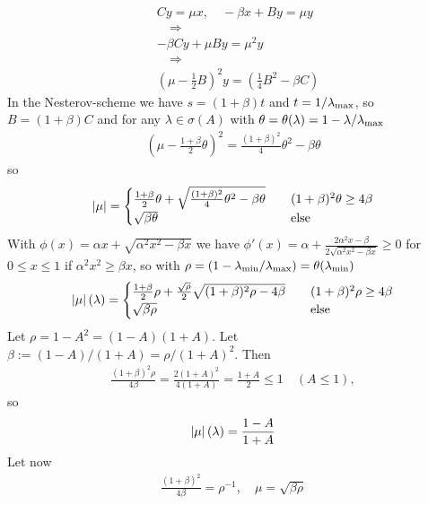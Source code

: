 \documentclass[english,12pt,a4paper]{article}
\begin{document}
%
\begin{align*}
&C y = \mu x, \quad  -\beta x + B y = \mu y
\\
&\quad\Rightarrow\quad 
\\
&-\beta Cy + \mu B y = \mu^2 y
\\
&\quad\Rightarrow\quad 
\\
&\left( \mu - \frac12 B\right)^2 y = (\frac14 B^2 - \beta C)
\end{align*}
%
In the Nesterov-scheme we  have $s=(1+\beta)t$ 
and  $t=1/\lambda_{\rm max}$, so $B = (1+\beta)C$ and for any $\lambda\in\sigma(A)$ with 
$\theta=\theta(\lambda)=1-\lambda/\lambda_{\rm max}$
%
\begin{align*}
\left( \mu - \frac{1+\beta}{2} \theta\right)^2 = \frac{(1+\beta)^2}{4} \theta^2 - \beta \theta
\end{align*}
%
so
%
\begin{align*}
\left\vert{\mu}\right\vert = \begin{cases}
\frac{1+\beta}{2}\theta+\sqrt{\frac{(1+\beta)^2}{4} \theta^2-\beta\theta}  &\quad (1+\beta)^2 \theta \ge 4\beta \\
\sqrt{\beta \theta} &\quad \mbox{else}
\end{cases}
\end{align*}
%
%
With $\phi(x) = \alpha x + \sqrt{\alpha^2 x^2-\beta x}$ we have $\phi'(x) = \alpha + \frac{2\alpha^2 x- \beta}{2\sqrt{\alpha^2 x^2-\beta x}}\ge0 $ for $0\le x \le 1$ if $\alpha^2x^2\ge \beta x$, so with $\rho = (1-\lambda_{\rm min}/\lambda_{\rm max})=\theta(\lambda_{\rm min})$
%
\begin{align*}
\left\vert{\mu}\right\vert(\lambda) = \begin{cases}
\frac{1+\beta}{2}\rho+ \frac{\sqrt{\rho}}{2}\sqrt{(1+\beta)^2\rho-4\beta}  &\quad (1+\beta)^2 \rho \ge 4\beta \\
\sqrt{\beta \rho} &\quad \mbox{else}
\end{cases}
\end{align*}
%
Let $\rho=1-A^2 = (1-A)(1+A)$. Let $\beta := (1-A)/(1+A) = \rho/(1+A)^2$. Then
%
\begin{align*}
\frac{(1+\beta)^2 \rho}{4\beta} = \frac{2(1+A)^2}{4(1+A)}= \frac{1+A}{2}\le 1 \quad (A\le 1),
\end{align*}
%
so
%
\begin{align*}
\left\vert{\mu}\right\vert(\lambda) = \frac{1-A}{1+A}
\end{align*}
%
Let now
%
\begin{align*}
\frac{(1+\beta)^2}{4\beta} =\rho^{-1}, \quad \mu = \sqrt{\beta\rho}
\end{align*}
\end{document}
